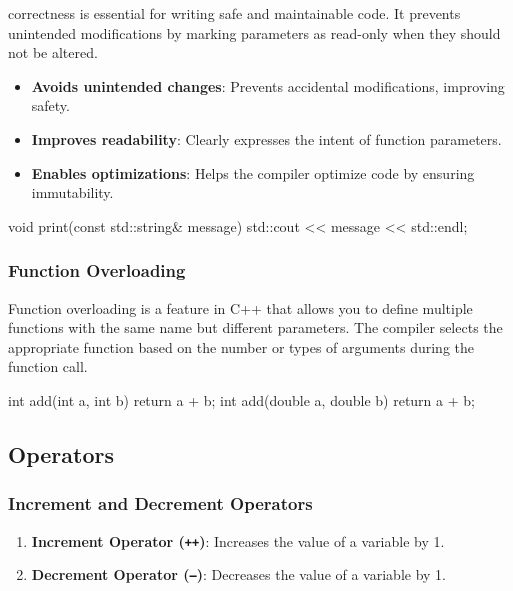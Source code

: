 \begin{warningblock}
     correctness is essential for writing safe and maintainable code. It prevents unintended modifications by marking parameters as read-only when they should not be altered.
    
    \begin{itemize}
        \item \textbf{Avoids unintended changes}: Prevents accidental modifications, improving safety.
        \item \textbf{Improves readability}: Clearly expresses the intent of function parameters.
        \item \textbf{Enables optimizations}: Helps the compiler optimize code by ensuring immutability.
    \end{itemize}

    \begin{codeblock}[language=C++, numbers = none]
void print(const std::string& message) {
    std::cout << message << std::endl;
}
    \end{codeblock}
\end{warningblock}



\subsubsection{Function Overloading} \label{function-overloading}
Function overloading is a feature in C++ that allows you to define multiple functions with the same name but different parameters. The compiler selects the appropriate function based on the number or types of arguments during the function call.

\begin{codeblock}[language=C++]
int add(int a, int b) {
    return a + b;
}
int add(double a, double b) {
    return a + b;
}
\end{codeblock}

\subsection{Operators}

\subsubsection{Increment and Decrement Operators}

\begin{enumerate}
    \item \textbf{Increment Operator (\texttt{++})}: Increases the value of a variable by 1.
    \item \textbf{Decrement Operator (\texttt{--})}: Decreases the value of a variable by 1.
\end{enumerate}

